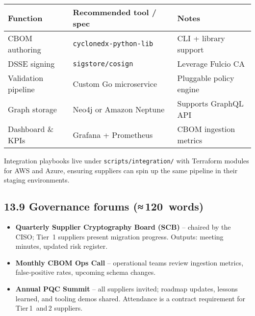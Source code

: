 \documentclass[
  english,
]{article}
\providecommand{\tightlist}{%
  \setlength{\itemsep}{0pt}\setlength{\parskip}{0pt}}
\begin{document}
\begin{longtable}[]{@{}
  >{\raggedright\arraybackslash}p{}
  >{\raggedright\arraybackslash}p{}
  >{\raggedright\arraybackslash}p{}@{}}
\toprule\noalign{}
\begin{minipage}[b]{\linewidth}\raggedright
Function
\end{minipage} & \begin{minipage}[b]{\linewidth}\raggedright
Recommended tool / spec
\end{minipage} & \begin{minipage}[b]{\linewidth}\raggedright
Notes
\end{minipage} \\
\midrule\noalign{}
\endhead
\bottomrule\noalign{}
\endlastfoot
CBOM authoring & \texttt{cyclonedx‑python‑lib} & CLI + library
support \\
DSSE signing & \texttt{sigstore/cosign} & Leverage Fulcio CA \\
Validation pipeline & Custom Go microservice & Pluggable policy
engine \\
Graph storage & Neo4j or Amazon Neptune & Supports GraphQL API \\
Dashboard \& KPIs & Grafana + Prometheus & CBOM ingestion metrics \\
\end{longtable}

Integration playbooks live under \texttt{scripts/integration/} with
Terraform modules for AWS and Azure, ensuring suppliers can spin up the
same pipeline in their staging environments.

\subsection{13.9 Governance forums
(≈\,120~words)}\label{governance-forums-120-words}

\begin{itemize}
\tightlist
\item
  \textbf{Quarterly Supplier Cryptography Board (SCB)} -- chaired by the
  CISO; Tier~1 suppliers present migration progress. Outputs: meeting
  minutes, updated risk register.
\item
  \textbf{Monthly CBOM Ops Call} -- operational teams review ingestion
  metrics, false‑positive rates, upcoming schema changes.
\item
  \textbf{Annual PQC Summit} -- all suppliers invited; roadmap updates,
  lessons learned, and tooling demos shared. Attendance is a contract
  requirement for Tier\,1~and\,2 suppliers.
\end{itemize}
\end{document}
